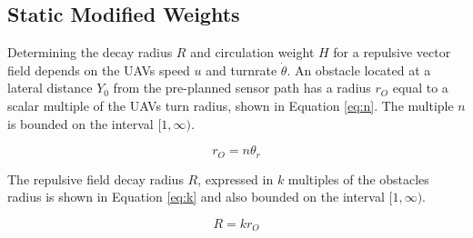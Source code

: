 \documentclass[conf]{new-aiaa}
\begin{document}
%
%
%
%
%
%
%
%
%



\subsection{Static Modified Weights}

Determining the decay radius $R$ and circulation weight $H$ for a repulsive vector field depends on the UAVs speed $u$ and turnrate $\dot{\theta}$. An obstacle located at a lateral distance $Y_0$ from the pre-planned sensor path has a radius $r_O$ equal to a scalar multiple of the UAVs turn radius, shown in Equation \ref{eq:n}. The multiple $n$ is bounded on the interval $[1,\infty)$.

\begin{equation}
\label{eq:n}
r_O = n \theta_r
\end{equation}

The repulsive field decay radius $R$, expressed in $k$ multiples of the obstacles radius is shown in Equation \ref{eq:k} and also bounded on the interval $[1,\infty)$.

\begin{equation}
\label{eq:k}
R = k r_O
\end{equation}
\end{document}

